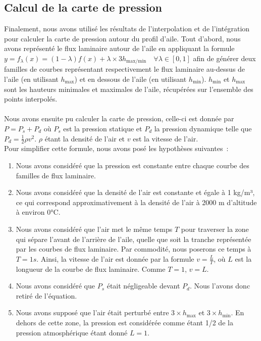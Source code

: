 \documentclass{article}
\begin{document}
\subsection{Calcul de la carte de pression}
Finalement, nous avons utilisé les résultats de l'interpolation et de l'intégration pour calculer la carte de pression autour du profil d'aile.
Tout d'abord, nous avons représenté le flux laminaire autour de l'aile en appliquant la formule 
$y = f_{\lambda}(x) = (1 - \lambda) f(x) + \lambda \times 3h_{\text{max/min}} \quad \forall \lambda \in [0, 1]$ afin de générer deux familles de courbes représentant respectivement le flux laminaire au-dessus de l'aile (en utilisant $h_{\text{max}}$) et en dessous de l'aile (en utilisant $h_{\text{min}}$). $h_{\text{min}}$ et $h_{\text{max}}$ sont les hauteurs minimales et maximales de l'aile, récupérées sur l'ensemble des points interpolés. \\ \\
Nous avons ensuite pu calculer la carte de pression, celle-ci est donnée par $P = P_s + P_d$ où  $P_s$ est la pression statique et $P_d$ la pression dynamique telle que $P_d = \frac{1}{2} \rho v^2$. $\rho$ étant la densité de l'air et $v$ est la vitesse de l'air. \\
Pour simplifier cette formule, nous avons posé les hypothèses suivantes~:
\begin{enumerate}
  \item Nous avons considéré que la pression est constante entre chaque courbe des familles de flux laminaire.
  \item Nous avons considéré que la densité de l'air est constante et égale à 1 kg/m³, ce qui correspond approximativement à la densité de l'air à 2000 m d'altitude à environ 0°C.
  \item Nous avons considéré que l'air met le même temps $T$ pour traverser la zone qui sépare l'avant de l'arrière de l'aile, quelle que soit la tranche représentée par les courbes de flux laminaire. Par commodité, nous poserons ce temps à $T=1s$. Ainsi, la vitesse de l'air est donnée par la formule $v = \frac{L}{T}$, où $L$ est la longueur de la courbe de flux laminaire. Comme $T=1$, $v=L$.
  \item Nous avons considéré que $P_s$ était négligeable devant $P_d$. Nous l'avons donc retiré de l'équation.
  \item Nous avons supposé que l'air était perturbé entre $3\times h_{\text{max}}$ et $3\times h_{\text{min}}$. En dehors de cette zone, la pression est considérée comme étant 1/2 de la pression atmosphérique étant donné $L = 1$.\\
\end{enumerate}
\end{document}
